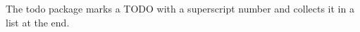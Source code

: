 \documentclass[11pt]{article}\usepackage[paperwidth=14cm,paperheight=7cm,left=1cm,right=3.6cm,top=1cm,bottom=1cm,marginparwidth=2.6cm,marginparsep=3mm]{geometry}\pagestyle{empty}
\begin{document}
The todo package marks a TODO with a superscript number and collects it in a list at the end.

\todos
\end{document}
